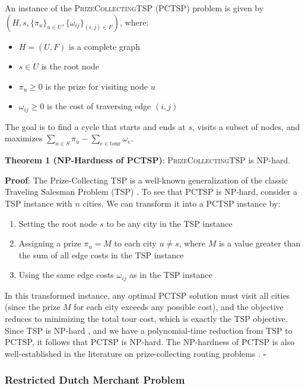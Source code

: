 \documentclass[12pt]{article}
\begin{document}
An instance of the \textsc{PrizeCollectingTSP} (PCTSP) problem is given by $(H, s, \{\pi_u\}_{u \in U}, \{\omega_{ij}\}_{(i,j) \in F})$, where:
\begin{itemize}
    \item $H=(U, F)$ is a complete graph
    \item $s \in U$ is the root node
    \item $\pi_u \geq 0$ is the prize for visiting node $u$
    \item $\omega_{ij} \geq 0$ is the cost of traversing edge $(i,j)$
\end{itemize}

The goal is to find a cycle that starts and ends at $s$, visits a subset of nodes, and maximizes $\sum_{u \in S} \pi_u - \sum_{e \in \text{tour}} \omega_e$.

\textbf{Theorem 1 (NP-Hardness of PCTSP)}: \textsc{PrizeCollectingTSP} is NP-hard.

\textbf{Proof}: The Prize-Collecting TSP is a well-known generalization of the classic Traveling Salesman Problem (TSP) \cite{karp1972}. To see that PCTSP is NP-hard, consider a TSP instance with $n$ cities. We can transform it into a PCTSP instance by:
\begin{enumerate}
    \item Setting the root node $s$ to be any city in the TSP instance
    \item Assigning a prize $\pi_u = M$ to each city $u \neq s$, where $M$ is a value greater than the sum of all edge costs in the TSP instance
    \item Using the same edge costs $\omega_{ij}$ as in the TSP instance
\end{enumerate}

In this transformed instance, any optimal PCTSP solution must visit all cities (since the prize $M$ for each city exceeds any possible cost), and the objective reduces to minimizing the total tour cost, which is exactly the TSP objective. Since TSP is NP-hard \cite{karp1972}, and we have a polynomial-time reduction from TSP to PCTSP, it follows that PCTSP is NP-hard. The NP-hardness of PCTSP is also well-established in the literature on prize-collecting routing problems \cite{MarchettiSpaccamela2007PrizeCollectingTS}. \hfill $\square$

\subsubsection{Restricted Dutch Merchant Problem}
\end{document}
